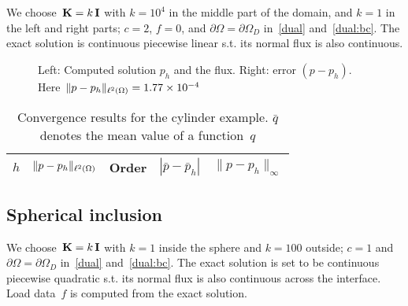 We choose~$\boldsymbol{\mathbf{K}} = k\,\boldsymbol{\mathbf{I}}$ with $k = 10^4$ in the middle part of the domain, and $k = 1$ in the left and right parts; $c = 2$, $f = 0$, and $\partial\Omega = \partial\Omega_D$ in~\eqref{dual} and~\eqref{dual:bc}. The exact solution is continuous piecewise linear s.t. its normal flux is also continuous.

\begin{figure}[H]
	\centering
	\begin{subfigure}[t]{.5\linewidth}
		\centering
	\end{subfigure}%
	\begin{subfigure}[t]{.5\linewidth}
		\centering
	\end{subfigure}%
	\caption{Left: Computed solution $p_h$ and the flux. Right: error $(p - p_h)$. Here~$\|p - p_h\|_{{\ell^2\left({\Omega}\right)}} = 1.77\times 10^{-4}$}
	\label{fig:cyl}		
\end{figure}

\begin{table}[H]
	\centering\footnotesize
	\caption{Convergence results for the cylinder example. $\bar q$ denotes the mean value of a function~$q$} 
	\label{tab:cyl}
	\begin{subtable}{1.\linewidth}
		\centering
		\begin{tabular}[1.2]{|c||c|c||c||c|}
			\hline
			$h$ & $\| p - p_h \|_{{\ell^2\left({\Omega}\right)}}$ & Order & $| \bar p - \bar p_h |$ & $\| p - p_h \|_{\infty}$ \\ 
			\hline
			
		\end{tabular}
	\end{subtable}%
\end{table}


\subsection{Spherical inclusion}

We choose~$\boldsymbol{\mathbf{K}} = k\,\boldsymbol{\mathbf{I}}$ with $k = 1$ inside the sphere and $k = 100$ outside; $c = 1$ and $\partial\Omega = \partial\Omega_D$ in~\eqref{dual} and~\eqref{dual:bc}. The exact solution is set to be continuous piecewise quadratic s.t. its normal flux is also continuous across the interface. Load data~$f$ is computed from the exact solution.

